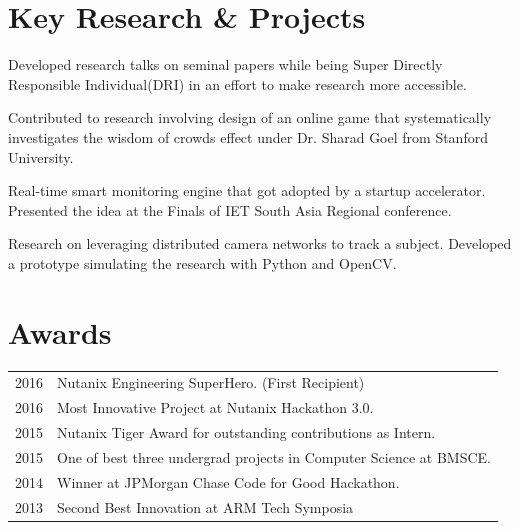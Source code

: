 \documentclass[]{deedy-resume-openfont}
\begin{document}
\begin{minipage}[t]{0.66\textwidth}

	\section{Key Research \& Projects}
	\href{https://scholar.stanford.edu/}{}
	Developed research talks on seminal papers while being Super Directly Responsible Individual(DRI) in an effort to make research more accessible.
	\sectionsep

	\href{http://wisdomofcrowds.stanford.edu}{}
	Contributed to research involving design of an online game that systematically investigates the wisdom of crowds effect under Dr. Sharad Goel from Stanford University.
	\sectionsep

	\href{http://sensorsmonitor.com}{}
	Real-time smart monitoring engine that got adopted by a startup accelerator. Presented the idea at the Finals of IET South Asia Regional conference.
	\sectionsep

	\href{https://github.com/ashriths/distributed-camera-network-simulations}{}
	Research on leveraging distributed camera networks to track a subject. Developed a prototype simulating the research with Python and OpenCV.
	\sectionsep


	\section{Awards}
	\begin{tabular}{ll}
		2016 & Nutanix Engineering SuperHero. (First Recipient)                   \\
		2016 & Most Innovative Project at Nutanix Hackathon 3.0.                  \\
		2015 & Nutanix Tiger Award for outstanding contributions as Intern.       \\
		2015 & One of best three undergrad projects in Computer Science at BMSCE. \\
		2014 & Winner at JPMorgan Chase Code for Good Hackathon.                  \\
		2013 & Second Best Innovation at ARM Tech Symposia
	\end{tabular}
	\sectionsep


\end{minipage}
\end{document}
